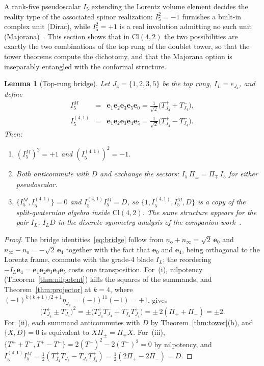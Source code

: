 \documentclass{birkjour}
\newtheorem{lem}[thm]{Lemma}
\theoremstyle{definition}
\theoremstyle{remark}
\numberwithin{equation}{section}
\newcommand{\Cl}{\mathrm{Cl}}
\newcommand{\e}[1]{\bm{e}_{#1}}
\newcommand{\no}{n_{\mathrm{o}}}
\newcommand{\ninf}{n_{\infty}}
\newenvironment{revblock}{}{}
\begin{document}
\begin{revblock}
A rank-five pseudoscalar $I_5$ extending the Lorentz volume
element decides the reality type of the associated spinor
realization: $I_5^2=-1$ furnishes a built-in complex unit
(Dirac), while $I_5^2=+1$ is a real involution admitting no
such unit (Majorana)~\cite{Lounesto2001}. This section
shows that in $\Cl(4,2)$ the two possibilities are exactly
the two combinations of the top rung of the doublet tower,
so that the tower theorems compute the dichotomy, and that
the Majorana option is inseparably entangled with the
conformal structure.

\begin{lem}[Top-rung bridge]\label{lem:bridge}
Let $J_4=\{1,2,3,5\}$ be the top rung, $I_L=e_{J_4}$, and
define
\begin{eqnarray}\label{eq:bridge}
I_5^{M}&=&\e{1}\e{2}\e{3}\e{5}\e{0}
=\tfrac{1}{\sqrt2}\bigl(T^+_{J_4}+T^-_{J_4}\bigr),
\nonumber \\
I_5^{(4,1)}&=&\e{1}\e{2}\e{3}\e{4}\e{5}
=\tfrac{1}{\sqrt2}\bigl(T^+_{J_4}-T^-_{J_4}\bigr).
\end{eqnarray}
Then:
\begin{enumerate}[label=\textup{(\roman*)}]
\item $(I_5^{M})^2=+1$ and $(I_5^{(4,1)})^2=-1$.
\item Both anticommute with $D$ and exchange the sectors:
$I_5\,\Pi_\pm=\Pi_\mp\,I_5$ for either pseudoscalar.
\item $\{I_5^{M},I_5^{(4,1)}\}=0$ and
$I_5^{(4,1)}I_5^{M}=D$, so
$\{1,I_5^{(4,1)},I_5^{M},D\}$ is a copy of the
split-quaternion algebra inside $\Cl(4,2)$. The same
structure appears for the pair $I_L$, $I_LD$ in the
discrete-symmetry analysis of the companion
work~\cite{HansenCPT2026}.
\end{enumerate}
\end{lem}

\begin{proof}
The bridge identities~\eqref{eq:bridge} follow from
$\no+\ninf=\sqrt2\,\e{0}$ and $\ninf-\no=-\sqrt2\,\e{4}$
together with the fact that $\e{0}$ and $\e{4}$, being
orthogonal to the Lorentz frame, commute with the grade-4
blade $I_L$; the reordering
$-I_L\e{4}=\e{1}\e{2}\e{3}\e{4}\e{5}$ costs one
transposition.
For~(i), nilpotency (Theorem~\ref{thm:nilpotent}) kills the
squares of the summands, and Theorem~\ref{thm:projector} at
$k=4$, where $(-1)^{k(k+1)/2+1}\eta_{J_4}=(-1)^{11}(-1)=+1$,
gives
\begin{equation}
\bigl(T^+_{J_4}\pm T^-_{J_4}\bigr)^2
=\pm\bigl(T^+_{J_4}T^-_{J_4}+T^-_{J_4}T^+_{J_4}\bigr)
=\pm\,2(\Pi_++\Pi_-)=\pm2.
\end{equation}
For~(ii), each summand anticommutes with $D$ by
Theorem~\ref{thm:tower}(b), and $\{X,D\}=0$ is equivalent to
$X\Pi_\pm=\Pi_\mp X$.
For~(iii), $\{T^++T^-,T^+-T^-\}=2(T^+)^2-2(T^-)^2=0$ by
nilpotency, and
$I_5^{(4,1)}I_5^{M}
=\tfrac12(T^+_{J_4}T^-_{J_4}-T^-_{J_4}T^+_{J_4})
=\tfrac12(2\Pi_+-2\Pi_-)=D$.
\end{proof}


\end{revblock}
\end{document}
